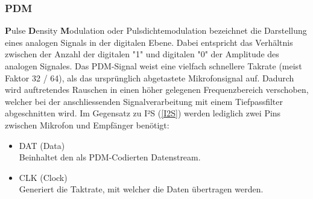 \documentclass[12pt]{article}
\begin{document}
	\subsubsection*{PDM} \label{PDM}
	\textbf{P}ulse \textbf{D}ensity \textbf{M}odulation oder Pulsdichtemodulation bezeichnet die Darstellung eines analogen Signals in der digitalen Ebene. Dabei entspricht das Verhältnis zwischen der Anzahl der digitalen "1" und digitalen "0" der Amplitude des analogen Signales. Das PDM-Signal weist eine vielfach schnellere Takrate (meist Faktor 32 / 64), als das ursprünglich abgetastete Mikrofonsignal auf. Dadurch wird auftretendes Rauschen in einen höher gelegenen Frequenzbereich verschoben, welcher bei der anschliessenden Signalverarbeitung mit einem Tiefpassfilter abgeschnitten wird. Im Gegensatz zu I²S (\ref{I2S}) werden lediglich zwei Pins zwischen Mikrofon und Empfänger benötigt:
	\begin{itemize}
		\item \color{red}DAT \color{black} \quad (Data) \\
		Beinhaltet den als PDM-Codierten Datenstream.
		\item CLK \quad (Clock) \\
		Generiert die Taktrate, mit welcher die Daten übertragen werden.
	\end{itemize}
\end{document}
